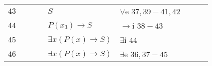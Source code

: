 \documentclass[a4paper,12pt]{article}
\begin{document}
\begin{tcolorbox}
\begin{tabular}{l l l l l l l l l}
    $43$  & \multicolumn{1}{|l}{} & \multicolumn{1}{|l}{} & & $S$ & $\vee$e $37,39-41,42$ & & \multicolumn{1}{l|}{} & \multicolumn{1}{l|}{} \\ \cline{3-8}
    
    $44$  & \multicolumn{1}{|l}{} & & & $P(x_3) \rightarrow S$ & $\rightarrow$i $38-43$ & & & \multicolumn{1}{l|}{} \\
    
    $45$  & \multicolumn{1}{|l}{} & & & $\exists x (P(x) \rightarrow S)$ & $\exists$i $44$ & & & \multicolumn{1}{l|}{} \\ \cline{2-9}
    
    $46$  & & & & $\exists x (P(x) \rightarrow S)$ & $\exists$e $36,37-45$ & & &
\end{tabular}
\end{tcolorbox}
\end{document}
